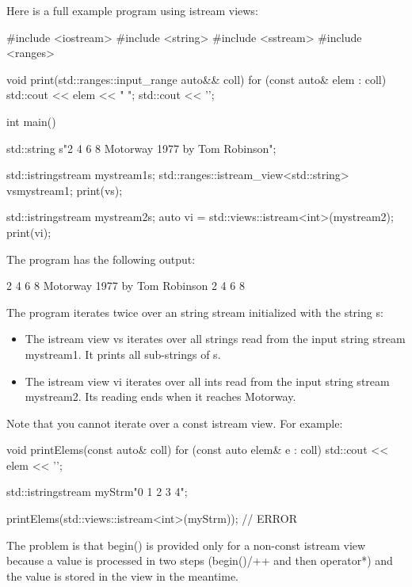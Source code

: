 Here is a full example program using istream views:


\begin{cpp}
#include <iostream>
#include <string>
#include <sstream>
#include <ranges>

void print(std::ranges::input_range auto&& coll)
{
	for (const auto& elem : coll) {
		std::cout << elem << " ";
	}
	std::cout << '\n';
}

int main()
{
	std::string s{"2 4 6 8 Motorway 1977 by Tom Robinson"};
	
	std::istringstream mystream1{s};
	std::ranges::istream_view<std::string> vs{mystream1};
	print(vs);
	
	std::istringstream mystream2{s};
	auto vi = std::views::istream<int>(mystream2);
	print(vi);
}
\end{cpp}

The program has the following output:

\begin{shell}
2 4 6 8 Motorway 1977 by Tom Robinson
2 4 6 8
\end{shell}

The program iterates twice over an string stream initialized with the string s:

\begin{itemize}
\item
The istream view vs iterates over all strings read from the input string stream mystream1. It prints all sub-strings of s.

\item
The istream view vi iterates over all ints read from the input string stream mystream2. Its reading ends when it reaches Motorway.
\end{itemize}


Note that you cannot iterate over a const istream view. For example:

\begin{cpp}
void printElems(const auto& coll) {
	for (const auto elem& e : coll) {
		std::cout << elem << '\n';
	}
}

std::istringstream myStrm{"0 1 2 3 4"};

printElems(std::views::istream<int>(myStrm)); // ERROR
\end{cpp}

The problem is that begin() is provided only for a non-const istream view because a value is processed in two steps (begin()/++ and then operator*) and the value is stored in the view in the meantime.

